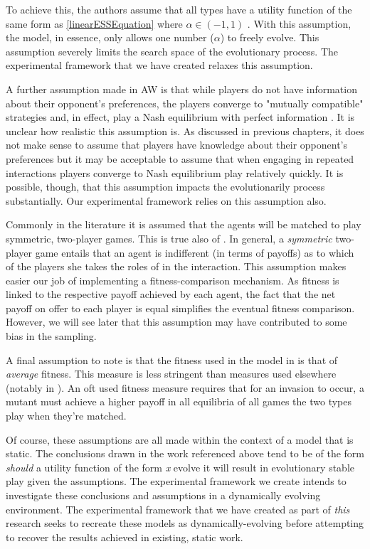 \documentclass[11pt]{book}
\newcommand*{\np}{\par\noindent\newline}
\begin{document}
\noindent To achieve this, the authors assume that all types have a utility function of the same form as \ref{linearESSEquation} where $\alpha \in (-1, 1)$ \citep[p. ~47]{alger_generalization_2012}.
With this assumption, the model, in essence, only allows one number ($\alpha$) to freely evolve.
This assumption severely limits the search space of the evolutionary process. 
The experimental framework that we have created relaxes this assumption.

\np A further assumption made in AW is that while players do not have information about their opponent's preferences,
the players converge to "mutually compatible" strategies and, in effect, play a Nash equilibrium with perfect information \citep[p. ~46]{alger_generalization_2012}.
It is unclear how realistic this assumption is. 
As discussed in previous chapters, it does not make sense to assume that players have knowledge about their opponent's preferences 
but it may be acceptable to assume that when engaging in repeated interactions players converge to Nash equilibrium play relatively quickly.
It is possible, though, that this assumption impacts the evolutionarily process substantially. 
Our experimental framework relies on this assumption also.

\np Commonly in the literature it is assumed that the agents will be matched to play symmetric, two-player games.
This is true also of \citet{alger_generalization_2012}.
In general, a \textit{symmetric} two-player game entails that an agent is indifferent (in terms of payoffs) as to which of the players she takes the roles of in the interaction.
This assumption makes easier our job of implementing a fitness-comparison mechanism.
As fitness is linked to the respective payoff achieved by each agent, the fact that the net payoff on offer to each player is equal simplifies the eventual fitness comparison.
However, we will see later that this assumption may have contributed to some bias in the sampling.

\np A final assumption to note is that the fitness used in the model in \citet{alger_generalization_2012} is that of \textit{average} fitness.
This measure is less stringent than measures used elsewhere (notably in \citet{alger_homo_2013}). 
An oft used fitness measure requires that for an invasion to occur, a mutant must achieve a higher payoff in all equilibria of all games the two types play when they're matched.

\np Of course, these assumptions are all made within the context of a model that is static.
The conclusions drawn in the work referenced above tend to be of the form \textit{should} a utility function of the form \textit{x} evolve it will result in evolutionary stable play given the assumptions.
The experimental framework we create intends to investigate these conclusions and assumptions in a dynamically evolving environment.
The experimental framework that we have created as part of \textit{this} research seeks to recreate these models as dynamically-evolving before attempting to recover the results achieved in existing, static work.
\end{document}
